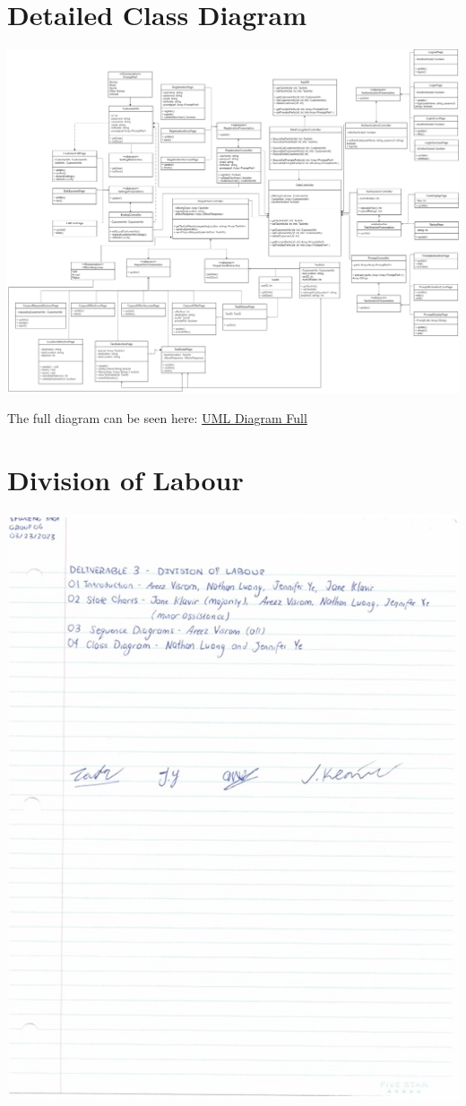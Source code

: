 \documentclass[]{article}
\begin{document}
\section{Detailed Class Diagram}
\label{sec:detailed_class_diagram}
\includegraphics[scale=0.2]{images/UML-ClassDiagram.png}

The full diagram can be seen here: \href{https://cdn.discordapp.com/attachments/1065661481171038298/1087213470207967252/3A04-UML-Diagram.drawio.png}{UML Diagram Full}


\appendix
\section{Division of Labour}
\label{sec:division_of_labour}
\includegraphics[scale=0.7]{images/DivisionOfLabour.jpg}
\end{document}

